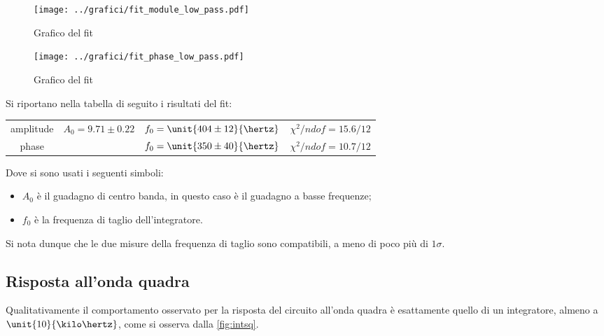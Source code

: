 \documentclass[10pt,a4paper]{article}
\begin{document}
\begin{figure}[h!]
\centering
	\begin{minipage}[h!]{0.48\textwidth}
		\centering
		\texttt{[image: ../grafici/fit\_module\_low\_pass.pdf]}
		\caption{Grafico del fit }
		\label{fig:lowamp}
	\end{minipage}
	\begin{minipage}[h!]{0.48\textwidth}
		\centering
		\texttt{[image: ../grafici/fit\_phase\_low\_pass.pdf]}
		\caption{Grafico del fit }
		\label{fig:lowph}
	\end{minipage}
\end{figure}

Si riportano nella tabella di seguito i risultati del fit:

\begin{table}[h!]
\centering
\begin{tabular}{c|ccc}
amplitude	&	$A_0 = 9.71 \pm 0.22$	&	$f_0 = \unit{404 \pm 12}{\hertz}$	&	$\chi^2/ndof = 15.6 / 12$\\
phase		& &	$f_0 = \unit{350 \pm 40}{\hertz}$	&	$\chi^2/ndof = 10.7 / 12$
\end{tabular}
\end{table}

\noindent Dove si sono usati i seguenti simboli:
\begin{itemize}
\item $A_0$ è il guadagno di centro banda, in questo caso è il guadagno a basse frequenze;
\item $f_0$ è la frequenza di taglio dell'integratore.
\end{itemize}

Si nota dunque che le due misure della frequenza di taglio sono compatibili, a meno di poco più di $1\sigma$.

\subsection{Risposta all'onda quadra}

Qualitativamente il comportamento osservato per la risposta del circuito all'onda quadra è esattamente quello di un integratore, almeno a $\unit{10}{\kilo\hertz}$, come si osserva dalla \figurename{\ref{fig:intsq}}.
\end{document}
